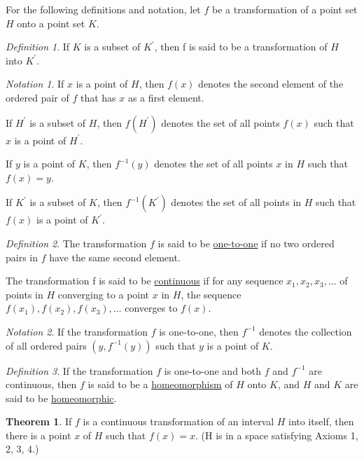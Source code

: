 \documentclass[12pt, oneside, letter] {amsart}
\theoremstyle {definition}
\newtheorem {thm} {Theorem}
\theoremstyle {remark}
\newtheorem* {defn} {Definition}
\newtheorem* {note} {Notation}
\begin{document}
 For the following definitions and notation, let $f$ be a
 transformation of a point set $H$ onto a point set $K$.
 
 \begin{defn}
   If $K$ is a subset of $K^\prime$, then f is said to be a transformation
   of $H$ into $K^\prime$.
 \end{defn}

 \begin{note}   
   If $x$ is a point of $H$, then $f(x)$ denotes the second element of
   the ordered pair of $f$ that has $x$ as a first element.
   
   If $H^\prime$ is a subset of $H$, then $f(H^\prime)$ denotes the set of all
   points $f(x)$ such that $x$ is a point of $H^\prime$.
   
   If $y$ is a point of $K$, then $f^{-1}(y)$ denotes the set of all
   points $x$ in $H$ such that $f(x) = y$.
   
   If $K^\prime$ is a subset of $K$, then $f^{-1}(K^\prime)$ denotes the set
   of all points in $H$ such that $f(x)$ is a point of $K^\prime$.
 \end{note}

 \begin{defn}
   The transformation $f$ is said to be \underline {one-to-one} if no
   two ordered pairs in $f$ have the same second element.
   
   The transformation f is said to be \underline {continuous} if for
   any sequence $x_1, x_2, x_3, \dots$ of points in $H$ converging to
   a point $x$ in $H$, the sequence $f(x_1), f(x_2), f(x_3), \dots$
   converges to $f(x)$.
\end{defn}

\begin{note} 
  If the transformation $f$ is one-to-one, then $f^{-1}$ denotes the
  collection of all ordered pairs $\left(y, f^{-1}(y)\right)$ such
  that $y$ is a point of $K$.
\end{note}

\begin{defn}
  If the transformation $f$ is one-to-one and both $f$ and $f^{-1}$
  are continuous, then $f$ is said to be a \underline {homeomorphism}
  of $H$ onto $K$, and $H$ and $K$ are said to be \underline
  {homeomorphic}.
\end{defn}

\begin{thm}
  If $f$ is a continuous transformation of an interval $H$ into
  itself, then there is a point $x$ of $H$ such that $f(x) = x$. (H is
  in a space satisfying Axioms 1, 2, 3, 4.)
\end{thm}
\end{document}
